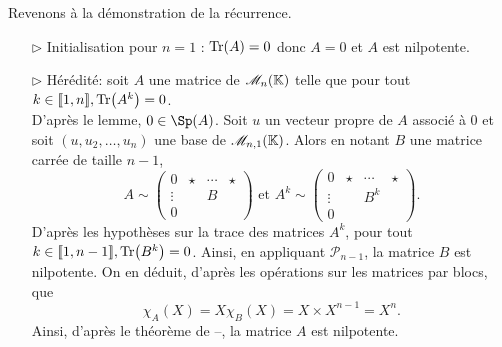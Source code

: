 \begin{demo}
\begin{itemize}
        Revenons à la démonstration de la récurrence.
        \begin{itemize}
            \item[$\rhd$] Initialisation pour $n=1$ : $\Tr(A) = 0$ donc $A = 0$ et $A$ est nilpotente. 
            \item[$\rhd$] Hérédité: soit $A$ une matrice de $\mathscr{M}_n(\mathbb{K})$ telle que pour tout $k \in \llbracket 1, n \rrbracket, \Tr(A^k) = 0$. \\
            D'après le lemme, $0 \in \Sp(A)$. Soit $u$ un vecteur propre de $A$ associé à $0$ et soit $(u, u_2, \dots, u_n)$ une base de $\mathscr{M}_{n,1}(\mathbb{K})$. Alors en notant $B$ une matrice carrée de taille $n-1$, 
            $$A \sim 
            \begin{pmatrix}
            0 & \star & \cdots & \star \\
            \vdots & & B & \\
            0 & & &
            \end{pmatrix}
            \text{ et }
            A^k \sim 
            \begin{pmatrix}
            0 & \star & \cdots & \star \\
            \vdots & & B^k & \\
            0 & & &
            \end{pmatrix}.
            $$
            D'après les hypothèses sur la trace des matrices $A^k$, pour tout $k \in \llbracket 1, n-1 \rrbracket, \Tr(B^k) = 0$. Ainsi, en appliquant $\mathscr{P}_{n-1}$, la matrice $B$ est nilpotente. On en déduit, d'après les opérations sur les matrices par blocs, que
            $$\chi_A(X) = X \chi_{B}(X) = X \times X^{n-1} = X^n.$$
            Ainsi, d'après le théorème de --, la matrice $A$ est nilpotente. 
        \end{itemize}
    \end{itemize}
\end{demo}

